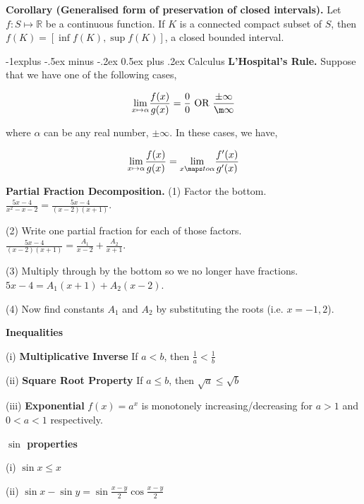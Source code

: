 \documentclass[10pt,landscape]{article}
\makeatletter
\renewcommand{\subsection}{\@startsection{subsection}{2}{0mm}%
                                {-1explus -.5ex minus -.2ex}%
                                {0.5ex plus .2ex}%
                                {\normalfont\normalsize\bfseries}}
\makeatother
\begin{document}
\begin{multicols}{4}
\textbf{Corollary (Generalised form of preservation of closed intervals).} Let $f: S \mapsto \mathbb{R}$ be a continuous function. If $K$ is a connected compact subset of $S$, then $f(K) = [\inf f(K), \sup f(K)]$, a closed bounded interval.

\subsection{Calculus}
\textbf{L'Hospital's Rule.} Suppose that we have one of the following cases,

$$
\underset{x \mapsto \alpha}{\lim} \frac{f(x)}{g(x)} = \frac{0}{0} \text{ OR } \frac{\pm \infty}{\m \infty}
$$

where $\alpha$ can be any real number, $\pm \infty$. In these cases, we have,

$$
\underset{x \mapsto \alpha}{\lim} \frac{f(x)}{g(x)} = \underset{x \maps to \alpha}{\lim} \frac{f'(x)}{g'(x)}
$$

\textbf{Partial Fraction Decomposition.}
(1) Factor the bottom. $\frac{5x-4}{x^2 -x - 2} = \frac{5x-4}{(x-2)(x+1)}$.

(2) Write one partial fraction for each of those factors. $\frac{5x-4}{(x-2)(x+1)} = \frac{A_1}{x-2} + \frac{A_2}{x+1}$. 

(3) Multiply through by the bottom so we no longer have fractions. $5x - 4 = A_1 (x+1) + A_2 (x-2)$.

(4) Now find constants $A_1$ and $A_2$ by substituting the roots (i.e. $x = -1, 2$).

\textbf{Inequalities}

(i) \textbf{Multiplicative Inverse} If $a < b$, then $\frac{1}{ a} < \frac{1}{b}$

(ii) \textbf{Square Root Property} If $a \leq b$, then $\sqrt{a} \leq \sqrt{b}$

(iii) \textbf{Exponential} $f(x) = a^x$ is monotonely increasing/decreasing for $a > 1$ and $0 < a < 1$ respectively.

\textbf{$\sin$ properties}

(i) $\sin x \leq x$

(ii) $\sin x - \sin y = \sin \frac{x - y}{2} \cos \frac{x - y}{2}$




\end{multicols}
\end{document}
